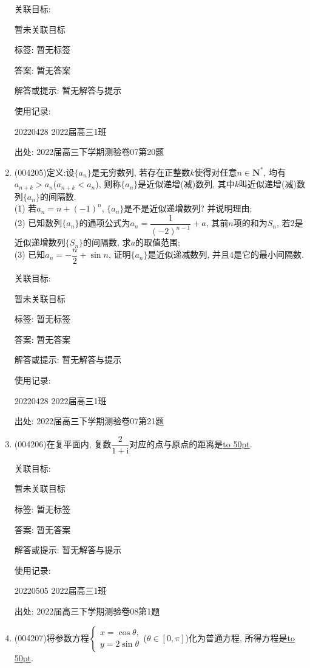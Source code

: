 \documentclass[10pt,a4paper]{article}
\newcommand{\blank}[1]{\underline{\hbox to #1pt{}}}
\begin{document}
\begin{enumerate}[1.]
关联目标:

暂未关联目标



标签: 暂无标签

答案: 暂无答案

解答或提示: 暂无解答与提示

使用记录:

20220428	2022届高三1班			


出处: 2022届高三下学期测验卷07第20题
\item { (004205)}定义:设$\{a_n\}$是无穷数列, 若存在正整数$k$使得对任意$n\in \mathbf{N}^*$, 均有$a_{n+k}>a_n$($a_{n+k}<a_n$), 则称$\{a_n\}$是近似递增(减)数列, 其中$k$叫近似递增(减)数列$\{a_n\}$的间隔数.\\
(1) 若$a_n=n+(-1)^n$, $\{a_n\}$是不是近似递增数列? 并说明理由;\\
(2) 已知数列$\{a_n\}$的通项公式为$a_n=\dfrac 1{(-2)^{n-1}}+a$, 其前$n$项的和为$S_n$, 若$2$是近似递增数列$\{S_n\}$的间隔数, 求$a$的取值范围;\\
(3) 已知$a_n=-\dfrac n2+\sin n$, 证明$\{a_n\}$是近似递减数列, 并且$4$是它的最小间隔数.


关联目标:

暂未关联目标



标签: 暂无标签

答案: 暂无答案

解答或提示: 暂无解答与提示

使用记录:

20220428	2022届高三1班			


出处: 2022届高三下学期测验卷07第21题
\item { (004206)}在复平面内, 复数$\dfrac 2{1+\mathrm{i}}$对应的点与原点的距离是\blank{50}.


关联目标:

暂未关联目标



标签: 暂无标签

答案: 暂无答案

解答或提示: 暂无解答与提示

使用记录:

20220505	2022届高三1班	


出处: 2022届高三下学期测验卷08第1题
\item { (004207)}将参数方程$\begin{cases} x=\cos \theta,  \\ y=2\sin \theta  \end{cases}$($\theta \in [0,\pi ]$)化为普通方程, 所得方程是\blank{50}.



\end{enumerate}
\end{document}
